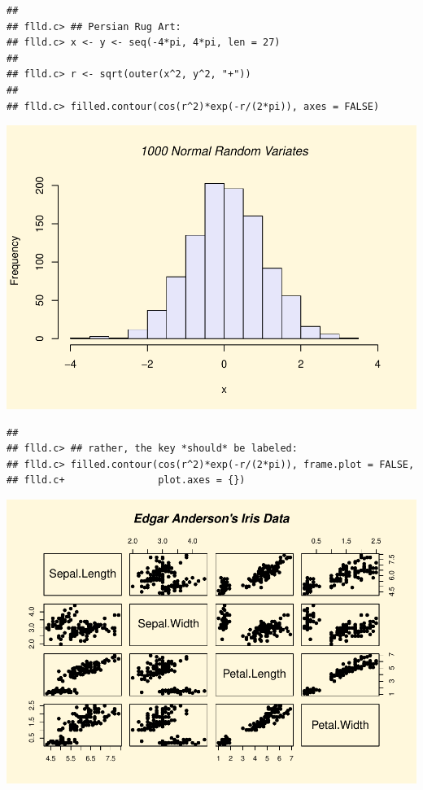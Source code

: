 \documentclass[
]{book}
\begin{document}
\begin{verbatim}
## 
## flld.c> ## Persian Rug Art:
## flld.c> x <- y <- seq(-4*pi, 4*pi, len = 27)
## 
## flld.c> r <- sqrt(outer(x^2, y^2, "+"))
## 
## flld.c> filled.contour(cos(r^2)*exp(-r/(2*pi)), axes = FALSE)
\end{verbatim}

\includegraphics{TudodoR_files/figure-latex/unnamed-chunk-147-7.pdf}

\begin{verbatim}
## 
## flld.c> ## rather, the key *should* be labeled:
## flld.c> filled.contour(cos(r^2)*exp(-r/(2*pi)), frame.plot = FALSE,
## flld.c+                plot.axes = {})
\end{verbatim}

\includegraphics{TudodoR_files/figure-latex/unnamed-chunk-147-8.pdf}
\end{document}
